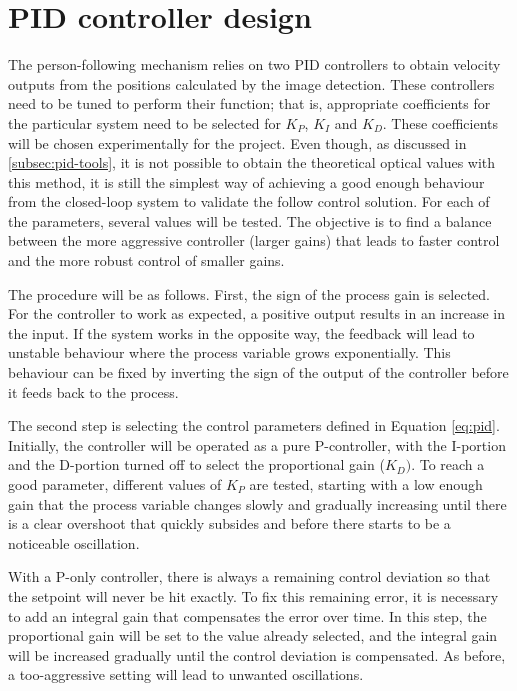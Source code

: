 \section{PID controller design}
\label{sec:test-1-pid}


The person-following mechanism relies on two PID controllers to obtain velocity outputs from the positions calculated by the image detection. These controllers need to be tuned to perform their function; that is, appropriate coefficients for the particular system need to be selected for $K_P$, $K_I$ and $K_D$. These coefficients will be chosen experimentally for the project. Even though, as discussed in \ref{subsec:pid-tools}, it is not possible to obtain the theoretical optical values with this method, it is still the simplest way of achieving a good enough behaviour from the closed-loop system to validate the follow control solution. For each of the parameters, several values will be tested. The objective is to find a balance between the more aggressive controller (larger gains) that leads to faster control and the more robust control of smaller gains.

The procedure will be as follows. First, the sign of the process gain is selected. For the controller to work as expected, a positive output results in an increase in the input. If the system works in the opposite way, the feedback will lead to unstable behaviour where the process variable grows exponentially. This behaviour can be fixed by inverting the sign of the output of the controller before it feeds back to the process.

The second step is selecting the control parameters defined in Equation \ref{eq:pid}. Initially, the controller will be operated as a pure P-controller, with the I-portion and the D-portion turned off to select the proportional gain ($K_D)$. To reach a good parameter, different values of $K_P$ are tested, starting with a low enough gain that the process variable changes slowly and gradually increasing until there is a clear overshoot that quickly subsides and before there starts to be a noticeable oscillation.

With a P-only controller, there is always a remaining control deviation so that the setpoint will never be hit exactly. To fix this remaining error, it is necessary to add an integral gain that compensates the error over time. In this step, the proportional gain will be set to the value already selected, and the integral gain will be increased gradually until the control deviation is compensated. As before, a too-aggressive setting will lead to unwanted oscillations.

